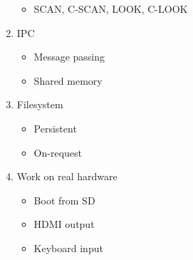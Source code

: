 \documentclass[10pt, a4paper]{article}
\begin{document}
\begin{enumerate}
\begin{itemize}
            \item SCAN, C-SCAN, LOOK, C-LOOK
        \end{itemize}
    \item IPC
        \begin{itemize}
            \item Message passing
            \item Shared memory
        \end{itemize}
    \item Filesystem
        \begin{itemize}
            \item Persistent
            \item On-request
        \end{itemize}
    \item Work on real hardware
        \begin{itemize}
            \item Boot from SD
            \item HDMI output
            \item Keyboard input
        \end{itemize}
\end{enumerate}
\end{document}
